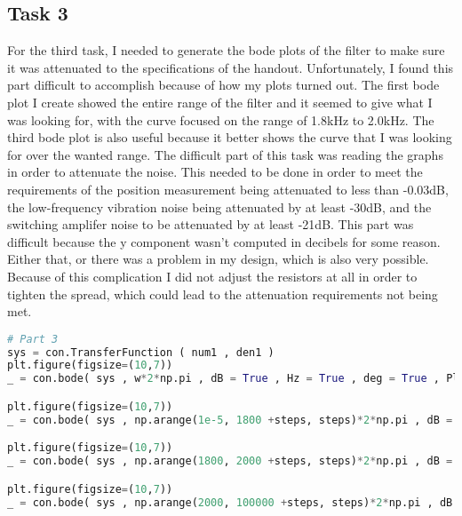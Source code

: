 \documentclass[12pt]{report}
\begin{document}
\subsection{Task 3}
For the third task, I needed to generate the bode plots of the filter to
make sure it was attenuated to the specifications of the handout.
Unfortunately, I found this part difficult to accomplish because of how
my plots turned out. The first bode plot I create showed the entire range of
the filter and it seemed to give what I was looking for, with the
curve focused on the range of 1.8kHz to 2.0kHz. The third bode plot is
also useful because it better shows the curve that I was looking for over
the wanted range. The difficult part of this task was reading the graphs
in order to attenuate the noise. This needed to be done in order to meet
the requirements of the position measurement being attenuated to less than
-0.03dB, the low-frequency vibration noise being attenuated by at least
-30dB, and the switching amplifer noise to be attenuated by at least -21dB.
This part was difficult because the y component wasn't computed in decibels
for some reason. Either that, or there was a problem in my design, which is
also very possible. Because of this complication I did not adjust the
resistors at all in order to tighten the spread, which could lead to
the attenuation requirements not being met.

\begin{lstlisting}[language=Python]
# Part 3
sys = con.TransferFunction ( num1 , den1 )
plt.figure(figsize=(10,7))
_ = con.bode( sys , w*2*np.pi , dB = True , Hz = True , deg = True , Plot = True )

plt.figure(figsize=(10,7))
_ = con.bode( sys , np.arange(1e-5, 1800 +steps, steps)*2*np.pi , dB = True , Hz = True , deg = True , Plot = True )

plt.figure(figsize=(10,7))
_ = con.bode( sys , np.arange(1800, 2000 +steps, steps)*2*np.pi , dB = True , Hz = True , deg = True , Plot = True )

plt.figure(figsize=(10,7))
_ = con.bode( sys , np.arange(2000, 100000 +steps, steps)*2*np.pi , dB = True , Hz = True , deg = True , Plot = True )
\end{lstlisting}
\end{document}
